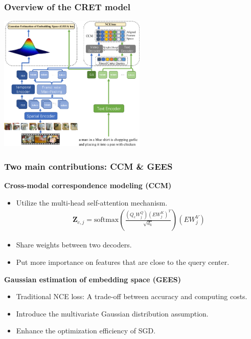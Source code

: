 \documentclass[notes, 10pt, aspectratio=169]{beamer}
\begin{document}
\begin{frame}
    \frametitle{Overview of the CRET model}
    \begin{center}
        \includegraphics[width=7cm]{model.png}
    \end{center}
\end{frame}

\begin{frame}
    \frametitle{Two main contributions: CCM \& GEES}
    \textbf{Cross-modal correspondence modeling (CCM)}
    \begin{itemize}
        \item Utilize the multi-head self-attention mechanism.
    \begin{align*}
        \mathbf{Z}_{c,j} = \text{softmax}\left( \frac{(Q_cW_j^Q)(EW_j^K)^T}{\sqrt{d_k}} \right) (EW_j^V)
    \end{align*}
        \item Share weights between two decoders.
        \item Put more importance on features that are close to the query center.
    \end{itemize}
    \textbf{Gaussian estimation of embedding space (GEES)}
    \begin{itemize}
        \item Traditional NCE loss: A trade-off between accuracy and computing costs.
        \item Introduce the multivariate Gaussian distribution assumption.
        \item Enhance the optimization efficiency of SGD.
    \end{itemize}
\end{frame}
\end{document}
